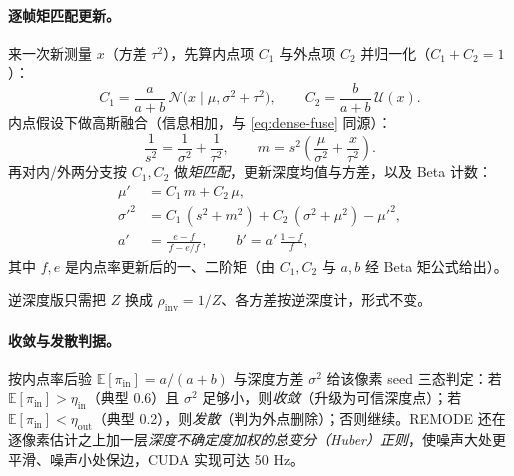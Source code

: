 \paragraph{逐帧矩匹配更新。}
来一次新测量 $x$（方差 $\tau^2$），先算内点项 $C_1$ 与外点项 $C_2$ 并归一化（$C_1+C_2=1$）：
\begin{equation}
  C_1=\frac{a}{a+b}\,\mathcal{N}\!\bigl(x\mid\mu,\sigma^2+\tau^2\bigr),\qquad
  C_2=\frac{b}{a+b}\,\mathcal{U}(x).
  \label{eq:dense-mix-resp}
\end{equation}
内点假设下做高斯融合（信息相加，与 \cref{eq:dense-fuse} 同源）：
\begin{equation}
  \frac{1}{s^2}=\frac{1}{\sigma^2}+\frac{1}{\tau^2},\qquad
  m=s^2\!\left(\frac{\mu}{\sigma^2}+\frac{x}{\tau^2}\right).
  \label{eq:dense-mix-kalman}
\end{equation}
再对内/外两分支按 $C_1,C_2$ 做\emph{矩匹配}，更新深度均值与方差，以及 Beta 计数：
\begin{align}
  \mu' &= C_1\,m + C_2\,\mu, \label{eq:dense-mix-mu}\\
  \sigma'^2 &= C_1\,(s^2+m^2) + C_2\,(\sigma^2+\mu^2) - \mu'^2, \label{eq:dense-mix-sig}\\
  a' &= \frac{e-f}{\,f-e/f\,},\qquad b'=a'\,\frac{1-f}{f}, \label{eq:dense-mix-ab}
\end{align}
其中 $f,e$ 是内点率更新后的一、二阶矩（由 $C_1,C_2$ 与 $a,b$ 经 Beta 矩公式给出）。

\begin{note}
逆深度版只需把 $Z$ 换成 $\rho_{\mathrm{inv}}=1/Z$、各方差按逆深度计，形式不变。
\end{note}

\paragraph{收敛与发散判据。}
按内点率后验 $\mathbb{E}[\pi_{\mathrm{in}}]=a/(a+b)$ 与深度方差 $\sigma^2$ 给该像素 seed 三态判定\cite{pizzoli2014remode}：若 $\mathbb{E}[\pi_{\mathrm{in}}]>\eta_{\mathrm{in}}$（典型 0.6）且 $\sigma^2$ 足够小，则\emph{收敛}（升级为可信深度点）；若 $\mathbb{E}[\pi_{\mathrm{in}}]<\eta_{\mathrm{out}}$（典型 0.2），则\emph{发散}（判为外点删除）；否则继续。REMODE 还在逐像素估计之上加一层\emph{深度不确定度加权的总变分（Huber）正则}，使噪声大处更平滑、噪声小处保边，CUDA 实现可达 50 Hz。

